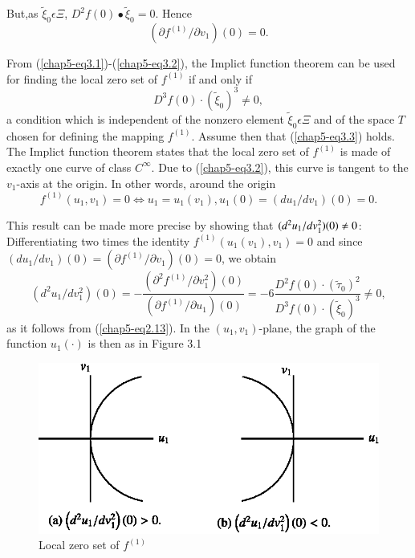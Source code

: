 But,\pageoriginale as $\widetilde{\xi}_{0} \epsilon \Xi$, $D^{2}f(0)
\bullet \widetilde{\xi}_{0} = 0$. Hence
\begin{equation*}
(\partial f^{(1)} / \partial v_{1})(0) = 0.\tag{3.2}\label{chap5-eq3.2}
\end{equation*}

From (\ref{chap5-eq3.1})-(\ref{chap5-eq3.2}), the Implict function
theorem can be used for finding the local zero set of $f^{(1)}$ if and
only if 
\begin{equation*}
D^{3}f(0) \cdot (\widetilde{\xi}_{0})^{3} \neq 0,\tag{3.3}\label{chap5-eq3.3}
\end{equation*}
a condition which is independent of the nonzero element
$\widetilde{\xi}_{0} \epsilon \Xi$ and of the space $T$ chosen for
defining the mapping $f^{(1)}$. Assume then that (\ref{chap5-eq3.3})
holds. The Implict function theorem states that the local zero set of
$f^{(1)}$ is made of exactly one curve of class $C^{\infty}$. Due to
(\ref{chap5-eq3.2}), this curve is tangent to the $v_{1}$-axis at the
origin. In other words, around the origin
$$
f^{(1)}(u_{1}, v_{1}) = 0 \Leftrightarrow u_{1} = u_{1}(v_{1}),
u_{1}(0) = (du_{1}/dv_{1})(0) = 0.
$$

This result can be made more precise by showing that $(d^{2}u_{1} /
dv_{1}^{2})\break (0) \neq 0$: Differentiating two times the identity
$f^{(1)} (u_{1}(v_{1}), v_{1}) = 0$ and since $(du_{1} / dv_{1}) (0) =
(\partial f^{(1)} / \partial v_{1})(0) = 0$, we obtain
\begin{equation*}
(d^{2}u_{1}/dv_{1}^{2})(0) = - \frac{(\partial^{2}f^{(1)}/ \partial
    v_{1}^{2})(0)}{(\partial f^{(1)} / \partial u_{1})(0)} = -
  6\frac{D^{2}f(0) \cdot (\widetilde{\tau}_{0})^{2}}{D^{3}f(0) \cdot
    (\widetilde{\xi}_{0})^{3}} \neq 0,\tag{3.4}\label{chap5-eq3.4}
\end{equation*}
as it follows from (\ref{chap5-eq2.13}). In the $(u_{1},
v_{1})$-plane, the graph of the function $u_{1}(\cdot)$ is then as in
Figure 3.1

\setcounter{figure}{0}
\begin{figure}[H]
\centering
\includegraphics{figure/fig76-3.1_2.eps}
\caption{Local zero set of $f^{(1)}$}
\end{figure}


